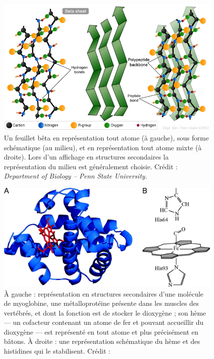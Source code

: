 	\begin{figure}[H]
		\centering
		\includegraphics[width=\textwidth]{figures/ch1/bSheet}
		\caption{Un feuillet bêta en représentation \og tout atome \fg{} (à gauche), sous forme schématique (au milieu), et en représentation \og tout atome \fg{} mixte (à droite). Lors d'un affichage \og en structures secondaires \fg{} la représentation du milieu est généralement choisie. Crédit : \emph{Department of Biology -- Penn State University.}\protect\footnotemark}
		\label{fig:bSheet}
	\end{figure}
		
	\begin{figure}[H]
		\centering
		\includegraphics[width=\textwidth]{figures/ch1/myoglobin}
		\caption{À gauche : représentation en structures secondaires d'une molécule de myoglobine, une métalloprotéine présente dans les muscles des vertébrés, et dont la fonction est de stocker le dioxygène ; son hème --- un cofacteur contenant un atome de fer et pouvant accueillir du dioxygène --- est représenté en \og tout atome \fg{} et plus précisément en bâtons. À droite : une représentation schématique du hème et des histidines qui le stabilisent. Crédit :~\cite{Ordway3441}}
		\label{fig:myoglobin}
	\end{figure}
	
